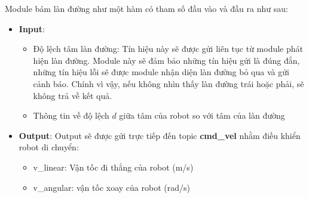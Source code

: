 Module bám làn đường như một hàm có tham số đầu vào và đầu ra như sau:
\begin{itemize}
    \item \textbf{Input}:
    \begin{itemize}
        \item Độ lệch tâm làn đường: Tín hiệu này sẽ được gửi liên tục từ module phát hiện làn đường. Module này sẽ đảm bảo những tín hiệu gửi là đúng đắn, những tín hiệu lỗi sẽ được module nhận diện làn đường bỏ qua và gửi cảnh báo. Chính vì vậy, nếu không nhìn thấy làn đường trái hoặc phải, sẽ không trả về kết quả.
        \item Thông tin về độ lệch $d$ giữa tâm của robot so với tâm của làn đường 
    \end{itemize}
    \item \textbf{Output}: Output sẽ được gửi trực tiếp đến topic \textbf{cmd\_vel} nhằm điều khiển robot di chuyển:
    \begin{itemize}
        \item v\_linear: Vận tốc đi thẳng của robot (m/s)
        \item v\_angular: vận tốc xoay của robot (rad/s)
    \end{itemize}
\end{itemize}
